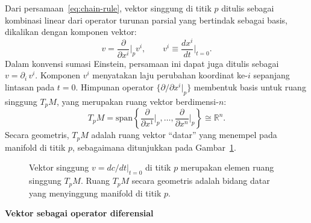 Dari persamaan~\eqref{eq:chain-rule}, vektor singgung di titik $p$ ditulis sebagai kombinasi linear dari operator turunan parsial yang bertindak sebagai basis, dikalikan dengan komponen vektor:
\begin{equation}\label{eq:tangent-vector}
    v = \frac{\partial}{\partial x^i}\bigg|_p v^i, \qquad
    v^i \equiv \frac{dx^i}{dt}\bigg|_{t=0}.
\end{equation}
Dalam konvensi sumasi Einstein, persamaan ini dapat juga ditulis sebagai $v = \partial_i\, v^i$. Komponen $v^i$ menyatakan laju perubahan koordinat ke-$i$ sepanjang lintasan pada $t = 0$. Himpunan operator $\{\partial/\partial x^i|_p\}$ membentuk basis untuk ruang singgung $T_pM$, yang merupakan ruang vektor berdimensi-$n$:
\begin{equation}
    T_pM = \mathrm{span}\left\{\frac{\partial}{\partial x^1}\bigg|_p, \ldots, \frac{\partial}{\partial x^n}\bigg|_p\right\} \cong \mathbb{R}^n.
\end{equation}
Secara geometris, $T_pM$ adalah ruang vektor ``datar'' yang menempel pada manifold di titik $p$, sebagaimana ditunjukkan pada Gambar~\ref{fig:tangent-vector}.

\begin{figure}[H]
\centering
{}
\caption{Vektor singgung $v = dc/dt|_{t=0}$ di titik $p$ merupakan elemen ruang singgung $T_pM$. Ruang $T_pM$ secara geometris adalah bidang datar yang menyinggung manifold di titik $p$.}
\label{fig:tangent-vector}
\end{figure}

\vspace{0.5em}
\noindent \textbf{Vektor sebagai operator diferensial}

